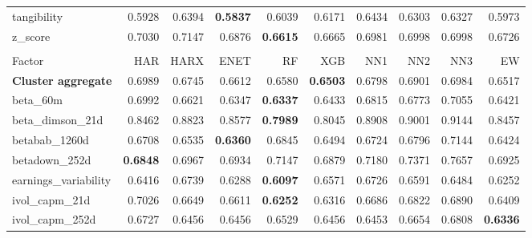 \begin{longtable}{>{\raggedright\arraybackslash}p{2.6cm}rrrrrrrrr}
tangibility & 0.5928 & 0.6394 & \textbf{\cellcolor{blue!10}0.5837} & 0.6039 & 0.6171 & 0.6434 & 0.6303 & 0.6327 & 0.5973 \\
z\_score & 0.7030 & 0.7147 & \cellcolor{blue!10}0.6876 & \textbf{\cellcolor{blue!10}0.6615} & \cellcolor{blue!10}0.6665 & \cellcolor{blue!10}0.6981 & \cellcolor{blue!10}0.6998 & \cellcolor{blue!10}0.6998 & \cellcolor{blue!10}0.6726 \\
\hline
\multicolumn{10}{@{}l}{\textit{Panel E. Low Risk}} \\
\hline
Factor & HAR & HARX & ENET & RF & XGB & NN1 & NN2 & NN3 & EW \\
\hline
\textbf{Cluster aggregate} & 0.6989 & \cellcolor{blue!10}0.6745 & \cellcolor{blue!10}0.6612 & \cellcolor{blue!10}0.6580 & \textbf{\cellcolor{blue!10}0.6503} & \cellcolor{blue!10}0.6798 & \cellcolor{blue!10}0.6901 & \cellcolor{blue!10}0.6984 & \cellcolor{blue!10}0.6517 \\
beta\_60m & 0.6992 & \cellcolor{blue!10}0.6621 & \cellcolor{blue!10}0.6347 & \textbf{\cellcolor{blue!10}0.6337} & \cellcolor{blue!10}0.6433 & \cellcolor{blue!10}0.6815 & \cellcolor{blue!10}0.6773 & 0.7055 & \cellcolor{blue!10}0.6421 \\
beta\_dimson\_21d & 0.8462 & 0.8823 & 0.8577 & \textbf{\cellcolor{blue!10}0.7989} & \cellcolor{blue!10}0.8045 & 0.8908 & 0.9001 & 0.9144 & \cellcolor{blue!10}0.8457 \\
betabab\_1260d & 0.6708 & \cellcolor{blue!10}0.6535 & \textbf{\cellcolor{blue!10}0.6360} & 0.6845 & \cellcolor{blue!10}0.6494 & 0.6724 & 0.6796 & 0.7144 & \cellcolor{blue!10}0.6424 \\
betadown\_252d & \textbf{0.6848} & 0.6967 & 0.6934 & 0.7147 & 0.6879 & 0.7180 & 0.7371 & 0.7657 & 0.6925 \\
earnings\_variability & 0.6416 & 0.6739 & \cellcolor{blue!10}0.6288 & \textbf{\cellcolor{blue!10}0.6097} & 0.6571 & 0.6726 & 0.6591 & 0.6484 & \cellcolor{blue!10}0.6252 \\
ivol\_capm\_21d & 0.7026 & \cellcolor{blue!10}0.6649 & \cellcolor{blue!10}0.6611 & \textbf{\cellcolor{blue!10}0.6252} & \cellcolor{blue!10}0.6316 & \cellcolor{blue!10}0.6686 & \cellcolor{blue!10}0.6822 & \cellcolor{blue!10}0.6890 & \cellcolor{blue!10}0.6409 \\
ivol\_capm\_252d & 0.6727 & \cellcolor{blue!10}0.6456 & \cellcolor{blue!10}0.6456 & \cellcolor{blue!10}0.6529 & \cellcolor{blue!10}0.6456 & \cellcolor{blue!10}0.6453 & \cellcolor{blue!10}0.6654 & 0.6808 & \textbf{\cellcolor{blue!10}0.6336} \\

\end{longtable}
